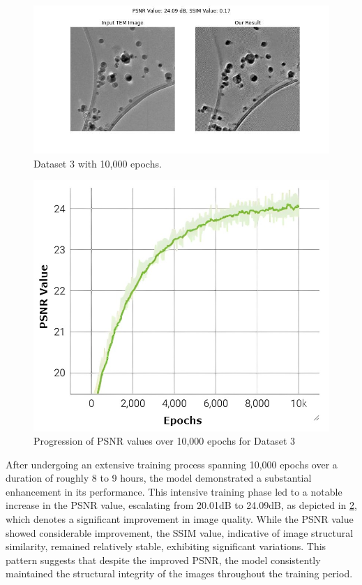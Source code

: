 \begin{figure}[H]
    \centering
    \includegraphics[width=1\textwidth]{img/Dataset_3_with_10000_epochs.jpg}
    \caption{Dataset 3 with 10,000 epochs.}\label{fig:Dataset_3_with_10000_epochs.jpg}
\end{figure}
\begin{figure}[H]
    \centering
    \includegraphics[width=.6\textwidth]{img/10K Psnr graph.jpg}
    \caption{Progression of PSNR values over 10,000 epochs for Dataset 3}\label{fig:Dataset 3 0 to 10000 epochs PSNR values}
\end{figure}

After undergoing an extensive training process spanning 10,000 epochs over a duration of roughly 8 to 9 hours, the model demonstrated a substantial enhancement in its performance. This intensive training phase led to a notable increase in the PSNR value, escalating from 20.01dB to 24.09dB, as depicted in \ref{fig:Dataset 3 0 to 10000 epochs PSNR values}, which denotes a significant improvement in image quality. While the PSNR value showed considerable improvement, the SSIM value, indicative of image structural similarity, remained relatively stable, exhibiting significant variations. This pattern suggests that despite the improved PSNR, the model consistently maintained the structural integrity of the images throughout the training period.


